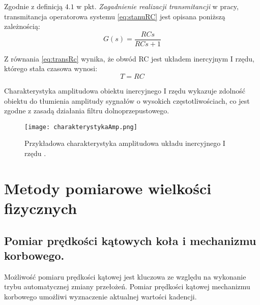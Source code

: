 Zgodnie z definicją $4.1$ w pkt. \textit{Zagadnienie realizacji transmitancji} w pracy\cite{graba}, transmitancja operatorowa systemu \ref{eq:stanuRC} jest opisana poniższą zależnością:
\begin{equation}
    G(s) = \frac{RCs}{RCs + 1}
    \label{eq:transRc}
\end{equation}

Z równania \ref{eq:transRc} wynika, że obwód RC jest  układem inercyjnym I rzędu, którego stała czasowa wynosi:
\begin{equation}
   T = RC
    \label{eq:stalaCzasowaRC}
\end{equation}

Charakterystyka amplitudowa obiektu inercyjnego I rzędu wykazuje zdolność obiektu do tłumienia amplitudy sygnałów o wysokich częstotliwościach, co jest zgodne z zasadą działania filtru dolnoprzepustowego.
\begin{figure}[h]
    \centering
    \texttt{[image: charakterystykaAmp.png]}
    \caption{Przykładowa charakterystyka amplitudowa układu inercyjnego I rzędu \cite{charakterystykaAmp}.}
    \label{fig:charamp}
\end{figure}

\label{filtrRc}
\section{Metody pomiarowe wielkości fizycznych}
\subsection{Pomiar prędkości kątowych koła i mechanizmu korbowego.}

Możliwość pomiaru prędkości kątowej jest kluczowa ze względu na wykonanie trybu automatycznej zmiany przełożeń. Pomiar prędkości kątowej mechanizmu korbowego umożliwi wyznaczenie aktualnej wartości kadencji.

